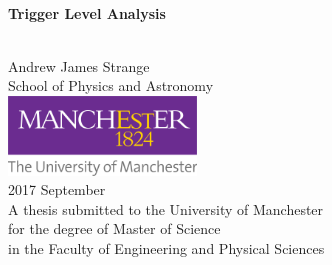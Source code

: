 \ifpdf
\fi
%
%
\begin{center}
 \qquad\\[10mm]
 {\renewcommand\baselinestretch{1.2}\Huge\textbf{
%
%
   Trigger Level Analysis
%
 }\par}
 \qquad\\[50mm]
 {\LARGE Andrew James Strange}\\[10mm]
 {\large School of Physics and Astronomy}\\[10mm]
 \includegraphics[width=50mm]{UniOfManchesterLogo.png}\\[30mm]
 {\Large 2017 September}\\[10mm]
 {\large A thesis submitted to the University of Manchester \\ for the degree of Master of Science \\ in the Faculty of Engineering and Physical Sciences}
\end{center}

\cleardoublepage

\endinput
